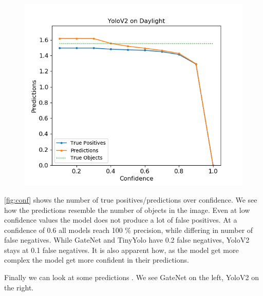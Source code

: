 \documentclass{article}
\begin{document}
\begin{figure}
\begin{minipage}{0.30\linewidth}
		\includegraphics[width=\linewidth]{fig/detection_v2}
	\end{minipage}
\label{fig:conf}
\end{figure}

\autoref{fig:conf} shows the number of true positives/predictions over confidence. We see how the predictions resemble the number of objects in the image. Even at low confidence values the model does not produce a lot of false positives. At a confidence of 0.6 all models reach 100 \% precision, while differing in number of false negatives. While GateNet and TinyYolo have 0.2 false negatives, YoloV2 stays at 0.1 false negatives. It is also apparent how, as the model get more complex the model get more confident in their predictions.

Finally we can look at some predictions . We see GateNet on the left, YoloV2 on the right.
\end{document}
